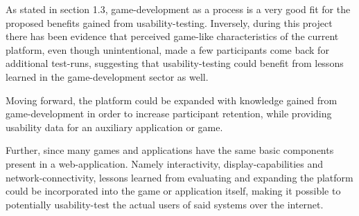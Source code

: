 	As stated in section 1.3, game-development as a process is a very good fit
	for the proposed benefits gained from usability-testing. Inversely, during
	this project there has been evidence that perceived game-like characteristics
	of the current platform, even though unintentional, made a few participants
	come back for additional test-runs, suggesting that usability-testing could
	benefit from lessons learned in the game-development sector as well.

	Moving forward, the platform could be expanded with knowledge gained from
	game-development in order to increase participant retention, while providing
	usability data for an auxiliary application or game.

	Further, since many games and applications have the same basic components
	present in a web-application. Namely interactivity, display-capabilities and
	network-connectivity, lessons learned from evaluating and expanding the
	platform could be incorporated into the game or application itself,
	making it possible to potentially usability-test the actual users of said
	systems over the internet.
